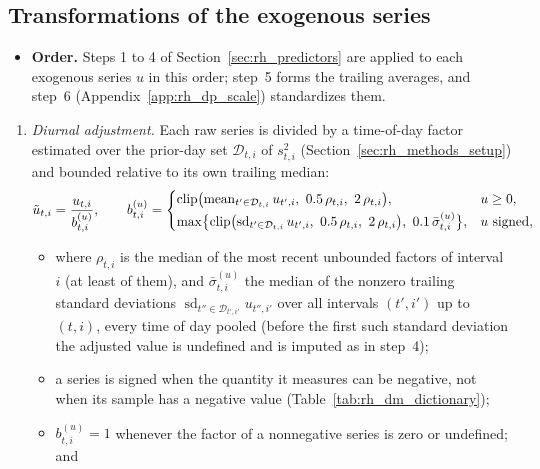 \subsection{Transformations of the exogenous series}
\label{app:rh_dp_transform}
\begin{itemize}
\item \textbf{Order.} Steps 1 to 4 of Section~\ref{sec:rh_predictors} are applied to each exogenous series $u$ in this
  order; step~5 forms the trailing averages, and step~6 (Appendix~\ref{app:rh_dp_scale}) standardizes them.
\end{itemize}
\begin{enumerate}
\item \emph{Diurnal adjustment.} Each raw series is divided by a time-of-day factor estimated over the prior-day set
  $\mathcal D_{t,i}$ of $s^2_{t,i}$ (Section~\ref{sec:rh_methods_setup}) and bounded relative to its own trailing
  median:
  \[
    \tilde u_{t,i} = \frac{u_{t,i}}{b^{(u)}_{t,i}}, \qquad
    b^{(u)}_{t,i} =
    \begin{cases}
      \clip\bigl(\operatorname{mean}_{t' \in \mathcal{D}_{t,i}} u_{t',i},\ \rhdmBandLo\,\rho_{t,i},\
        \rhdmBandHi\,\rho_{t,i}\bigr), & u \ge 0,\\[2pt]
      \max\bigl\{\clip\bigl(\operatorname{sd}_{t' \in \mathcal{D}_{t,i}} u_{t',i},\ \rhdmBandLo\,\rho_{t,i},\
        \rhdmBandHi\,\rho_{t,i}\bigr),\ \rhdmSdFloorFrac\,\bar\sigma^{(u)}_{t,i}\bigr\}, & u \text{ signed},
    \end{cases}
  \]
  \begin{itemize}
  \item where $\rho_{t,i}$ is the median of the \rhdmSlotRefWindow{} most recent unbounded factors of interval $i$
    (at least \rhdmSlotRefMin{} of them), and $\bar\sigma^{(u)}_{t,i}$ the median of the nonzero trailing standard
    deviations $\operatorname{sd}_{t'' \in \mathcal{D}_{t',i'}} u_{t'',i'}$ over all intervals $(t',i')$ up to
    $(t,i)$, every time of day pooled (before the first such standard deviation the adjusted value is undefined and
    is imputed as in step~4);
  \item a series is signed when the quantity it measures can be negative, not when its sample has a negative value
    (Table~\ref{tab:rh_dm_dictionary});
  \item $b^{(u)}_{t,i} = 1$ whenever the factor of a nonnegative series is zero or undefined; and

\end{itemize}
\end{enumerate}
